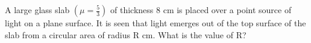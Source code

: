 
\item A large glass slab \((\mu = \frac{5}{3})\) of thickness 8 cm is placed over a point source of light on a plane surface. It is seen that light emerges out of the top surface of the slab from a circular area of radius R cm. What is the value of R?

